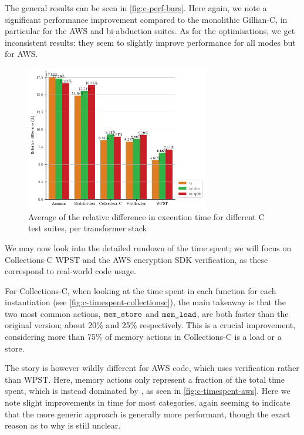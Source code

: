 The general results can be seen in \autoref{fig:c-perf-bars}. Here again, we note a significant performance improvement compared to the monolithic Gillian-C, in particular for the AWS and bi-abduction suites. As for the optimisations, we get inconsistent results: they seem to slightly improve performance for all modes but for AWS.

\begin{figure}
	\centering
	\includegraphics[width=8cm]{figures/c/avg_mode_relative_diff.pdf}
	\caption{Average of the relative difference in execution time for different C test suites, per transformer stack}
	\label{fig:c-perf-bars}
\end{figure}

We may now look into the detailed rundown of the time spent; we will focus on Collections-C WPST and the AWS encryption SDK verification, as these correspond to real-world code usage.

For Collections-C, when looking at the time spent in each function for each instantiation (see \autoref{fig:c-timespent-collectionsc}), the main takeaway is that the two most common actions, $\texttt{mem\_store}$ and $\texttt{mem\_load}$, are both faster than the original version; about 20\% and 25\% respectively. This is a crucial improvement, considering more than 75\% of memory actions in Collections-C is a load or a store.

The story is however wildly different for AWS code, which uses verification rather than WPST. Here, memory actions only represent a fraction of the total time spent, which is instead dominated by \consume, as seen in \autoref{fig:c-timespent-aws}. Here we note slight improvements in time for most categories, again seeming to indicate that the more generic approach is generally more performant, though the exact reason as to why is still unclear.


